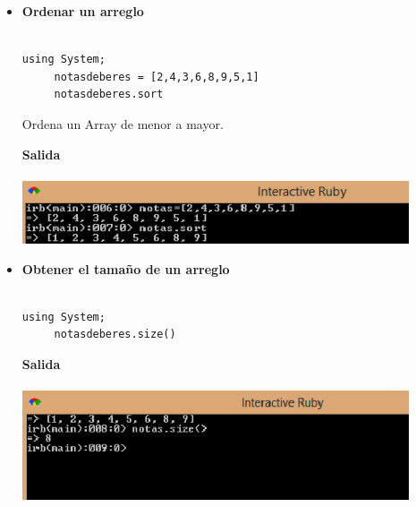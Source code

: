 \documentclass[11pt]{article} %
\begin{document}
\begin{itemize}
     \item {\bf Ordenar un arreglo}\\\\
\begin{lstlisting}[frame=single]  % Start your code-block
using System;
     notasdeberes = [2,4,3,6,8,9,5,1]
     notasdeberes.sort
\end{lstlisting}
\begin{center}
Ordena un Array de menor a mayor.
\end{center}
\bf Salida\\\\
    \includegraphics[width=0.9\textwidth]{./imagenes/OrdenarArreglo}\\


\newpage

    \item  {\bf Obtener el tamaño de un arreglo}\\\\
\begin{lstlisting}[frame=single]  % Start your code-block
using System;
     notasdeberes.size()
\end{lstlisting}
\bf Salida\\\\
        \includegraphics[width=0.9\textwidth]{./imagenes/SizeArreglo}\\\\



\end{itemize}
\end{document}
